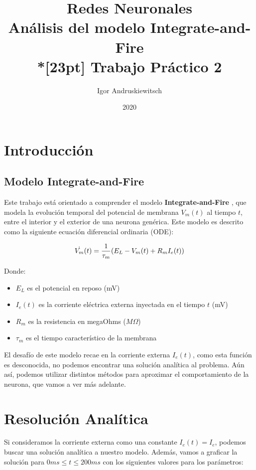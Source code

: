 \documentclass{article}
\title{%
Redes Neuronales \\
Análisis del modelo Integrate-and-Fire \\*[23pt]
Trabajo Práctico 2 \\
}
\date{2020}
\author{Igor Andruskiewitsch}
\begin{document}
    \maketitle

\section{Introducción}

\subsection{Modelo Integrate-and-Fire}

Este trabajo está orientado a comprender el modelo {\bf Integrate-and-Fire }, que modela la evolución temporal del potencial de membrana $ V_m(t) $ al tiempo $ t $, entre el interior y el exterior de una neurona genérica. Este modelo es descrito como la siguiente ecuación diferencial ordinaria (ODE):

\[ \dot{V_m}(t) = {1 \over \tau_m} (E_L - V_m(t) + R_m I_e(t)) \]

Donde:

\begin{itemize}
    \item {$ E_L $ es el potencial en reposo (mV) }
    \item {$ I_e(t) $ es la corriente eléctrica externa inyectada en el tiempo $ t $ (mV) }
    \item {$ R_m $ es la resistencia en megaOhms ($ M\Omega $) }
    \item {$ \tau_m $ es el tiempo característico de la membrana }
\end{itemize}

El desafío de este modelo recae en la corriente externa $ I_e(t) $, como esta función es desconocida, no podemos encontrar una solución analítica al problema. Aún así, podemos utilizar distintos métodos para aproximar el comportamiento de la neurona, que vamos a ver más adelante.

\pagebreak

\section{Resolución Analítica}

Si consideramos la corriente externa como una constante $ I_e(t) = I_e $, podemos buscar una solución analítica a nuestro modelo. Además, vamos a graficar la solución para $ 0ms \leq t \leq 200ms $ con los siguientes valores para los parámetros:
\end{document}
